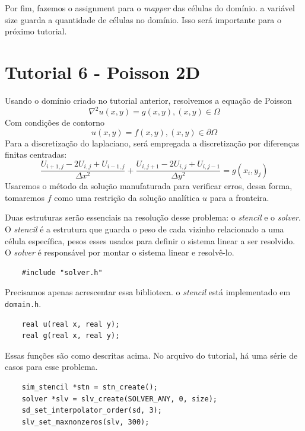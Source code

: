 Por fim, fazemos o assignment para o \textit{mapper} das células do domínio. a variável size guarda a quantidade de células no domínio. Isso será importante para o próximo tutorial.


\section{Tutorial 6 - Poisson 2D}
\label{sec:tut6}

Usando o domínio criado no tutorial anterior, resolvemos a equação de Poisson
\[
	\nabla^2u(x,y) = g(x,y), (x,y) \in \Omega
\]
Com condições de contorno
\[
	u(x,y) = f(x,y), (x,y) \in \partial \Omega
\]
Para a discretização do laplaciano, será empregada a discretização por diferenças finitas centradas:
\[
	\frac{U_{i+1,j}-2U_{i,j}+U_{i-1,j}}{\Delta x^2} + \frac{U_{i,j+1}-2U_{i,j}+U_{i,j-1}}{\Delta y^2} = g(x_i, y_j)
\]
Usaremos o método da solução manufaturada para verificar erros, dessa forma, tomaremos $f$ como uma restrição da solução analítica $u$ para a fronteira.

Duas estruturas serão essenciais na resolução desse problema: o \textit{stencil} e o \textit{solver}. O \textit{stencil} é a estrutura que guarda o peso de cada vizinho relacionado a uma célula específica, pesos esses usados para definir o sistema linear a ser resolvido. O \textit{solver} é responsável por montar o sistema linear e resolvê-lo.

\begin{verbatim}
	#include "solver.h"
\end{verbatim}

Precisamos apenas acrescentar essa biblioteca. o \textit{stencil} está implementado em \texttt{domain.h}.

\begin{verbatim}
	real u(real x, real y);
	real g(real x, real y);
\end{verbatim}

Essas funções são como descritas acima. No arquivo do tutorial, há uma série de casos para esse problema.

\begin{verbatim}
	sim_stencil *stn = stn_create();
	solver *slv = slv_create(SOLVER_ANY, 0, size);
	sd_set_interpolator_order(sd, 3);
    slv_set_maxnonzeros(slv, 300); 
\end{verbatim}

